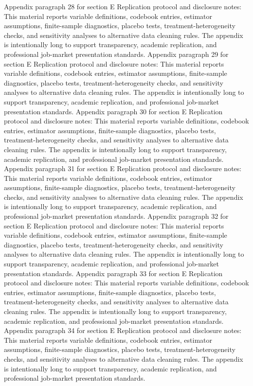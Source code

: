\documentclass[preprint,12pt]{elsarticle}
\begin{document}
Appendix paragraph 28 for section E Replication protocol and disclosure notes: This material reports variable definitions, codebook entries, estimator assumptions, finite-sample diagnostics, placebo tests, treatment-heterogeneity checks, and sensitivity analyses to alternative data cleaning rules. The appendix is intentionally long to support transparency, academic replication, and professional job-market presentation standards.
Appendix paragraph 29 for section E Replication protocol and disclosure notes: This material reports variable definitions, codebook entries, estimator assumptions, finite-sample diagnostics, placebo tests, treatment-heterogeneity checks, and sensitivity analyses to alternative data cleaning rules. The appendix is intentionally long to support transparency, academic replication, and professional job-market presentation standards.
Appendix paragraph 30 for section E Replication protocol and disclosure notes: This material reports variable definitions, codebook entries, estimator assumptions, finite-sample diagnostics, placebo tests, treatment-heterogeneity checks, and sensitivity analyses to alternative data cleaning rules. The appendix is intentionally long to support transparency, academic replication, and professional job-market presentation standards.
Appendix paragraph 31 for section E Replication protocol and disclosure notes: This material reports variable definitions, codebook entries, estimator assumptions, finite-sample diagnostics, placebo tests, treatment-heterogeneity checks, and sensitivity analyses to alternative data cleaning rules. The appendix is intentionally long to support transparency, academic replication, and professional job-market presentation standards.
Appendix paragraph 32 for section E Replication protocol and disclosure notes: This material reports variable definitions, codebook entries, estimator assumptions, finite-sample diagnostics, placebo tests, treatment-heterogeneity checks, and sensitivity analyses to alternative data cleaning rules. The appendix is intentionally long to support transparency, academic replication, and professional job-market presentation standards.
Appendix paragraph 33 for section E Replication protocol and disclosure notes: This material reports variable definitions, codebook entries, estimator assumptions, finite-sample diagnostics, placebo tests, treatment-heterogeneity checks, and sensitivity analyses to alternative data cleaning rules. The appendix is intentionally long to support transparency, academic replication, and professional job-market presentation standards.
Appendix paragraph 34 for section E Replication protocol and disclosure notes: This material reports variable definitions, codebook entries, estimator assumptions, finite-sample diagnostics, placebo tests, treatment-heterogeneity checks, and sensitivity analyses to alternative data cleaning rules. The appendix is intentionally long to support transparency, academic replication, and professional job-market presentation standards.
\end{document}
